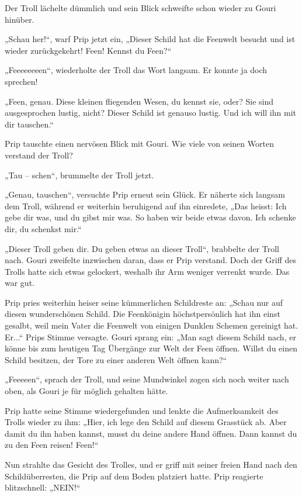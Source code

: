 Der Troll lächelte dümmlich und sein Blick schweifte schon wieder zu Gouri hinüber.

„Schau her!“, warf Prip jetzt ein, „Dieser Schild hat die Feenwelt besucht und ist wieder zurückgekehrt! Feen! Kennst du Feen?“

„Feeeeeeeen“, wiederholte der Troll das Wort langsam. Er konnte ja doch sprechen!

„Feen, genau. Diese kleinen fliegenden Wesen, du kennst sie, oder? Sie sind ausgesprochen lustig, nicht? Dieser Schild ist genauso lustig. Und ich will ihn mit dir tauschen.“

Prip tauschte einen nervösen Blick mit Gouri. Wie viele von seinen Worten verstand der Troll?

„Tau – schen“, brummelte der Troll jetzt.

„Genau, tauschen“, versuchte Prip erneut sein Glück. Er näherte sich langsam dem Troll, während er weiterhin beruhigend auf ihn einredete, „Das heisst: Ich gebe dir was, und du gibst mir was. So haben wir beide etwas davon. Ich schenke dir, du schenkst mir.“

„Dieser Troll geben dir. Du geben etwas an dieser Troll“, brabbelte der Troll nach. Gouri zweifelte inzwischen daran, dass er Prip verstand. Doch der Griff des Trolls hatte sich etwas gelockert, weshalb ihr Arm weniger verrenkt wurde. Das war gut.

Prip pries weiterhin heiser seine kümmerlichen Schildreste an: „Schau nur auf diesen wunderschönen Schild. Die Feenkönigin höchstpersönlich hat ihn einst gesalbt, weil mein Vater die Feenwelt von einigen Dunklen Schemen gereinigt hat. Er...“ Prips Stimme versagte. Gouri sprang ein: „Man sagt diesem Schild nach, er könne bis zum heutigen Tag Übergänge zur Welt der Feen öffnen. Willst du einen Schild besitzen, der Tore zu einer anderen Welt öffnen kann?“

„Feeeeen“, sprach der Troll, und seine Mundwinkel zogen sich noch weiter nach oben, als Gouri je für möglich gehalten hätte.

Prip hatte seine Stimme wiedergefunden und lenkte die Aufmerksamkeit des Trolls wieder zu ihm: „Hier, ich lege den Schild auf diesem Grasstück ab. Aber damit du ihn haben kannst, musst du deine andere Hand öffnen. Dann kannst du zu den Feen reisen! Feen!“

Nun strahlte das Gesicht des Trolles, und er griff mit seiner freien Hand nach den Schildüberresten, die Prip auf dem Boden platziert hatte. Prip reagierte blitzschnell: „NEIN!“

